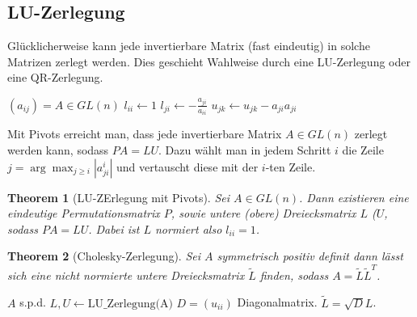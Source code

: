 \documentclass[10pt,a4paper]{article}
\newtheorem{theorem}{Theorem}
\begin{document}
	\subsection{LU-Zerlegung}
	Glücklicherweise kann jede invertierbare Matrix (fast eindeutig) in solche Matrizen zerlegt werden. Dies geschieht Wahlweise durch eine LU-Zerlegung oder eine QR-Zerlegung.
	\begin{algorithm}
		\caption{LU-Zerlegung ohne Pivots}
		\begin{algorithmic}
			\Require $(a_{ij}) = A \in GL(n)$
				\State $l_{ii} \leftarrow 1$
					\State $l_{ji} \leftarrow -\frac{a_{ji}}{a_{ii}}$
						\State $u_{jk} \leftarrow u_{jk} - a_{ji}a_{ji}$
					\EndFor
				\EndFor
			\EndFor
		\end{algorithmic}
	\end{algorithm}
	Mit Pivots erreicht man, dass jede invertierbare Matrix $A \in GL(n)$ zerlegt werden kann, sodass $PA = LU$. Dazu wählt man in jedem Schritt $i$ die Zeile $j = \arg \max_{j\geq i} |a^i_{ji}|$ und vertauscht diese mit der $i$-ten Zeile. 
	\begin{theorem}[LU-ZErlegung mit Pivots]
		Sei $A \in GL(n)$. Dann existieren eine eindeutige Permutationsmatrix $P$, sowie untere (obere) Dreiecksmatrix $L$ ($U$, sodass $PA =LU$. Dabei ist $L$ normiert also $l_{ii}= 1$.
	\end{theorem}
	\begin{theorem}[Cholesky-Zerlegung]
		Sei $A$ symmetrisch positiv definit dann lässt sich eine nicht normierte untere Dreiecksmatrix $\tilde{L}$ finden, sodass $A = \tilde{L}\tilde{L}^T$.
	\end{theorem}
	\begin{algorithm}
		\caption{Berechnung der Cholesky Zerlegung}
		\begin{algorithmic}
			\Require $A$ s.p.d.
			\State $L, U \leftarrow \text{LU\_Zerlegung(A)}$
			\State $D = (u_{ii})$ Diagonalmatrix.
			\State $\tilde{L} = \sqrt{D}L$.
		\end{algorithmic}
	\end{algorithm}
\end{document}
